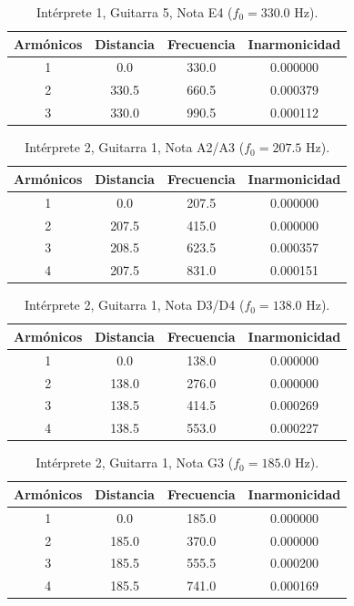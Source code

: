 \begin{table}[htbp]
  \centering
 \small
  \caption{Intérprete 1, Guitarra 5, Nota E4 ($f_0 = 330.0$ Hz).}
  \label{tab:interprete1_g5_e4}
  \begin{tabular}{cccc}
  \toprule
  Armónicos & Distancia & Frecuencia & Inarmonicidad \\
  \midrule
  1 & 0.0 & 330.0 & 0.000000 \\
  2 & 330.5 & 660.5 & 0.000379 \\
  3 & 330.0 & 990.5 & 0.000112 \\
  \bottomrule
  \end{tabular}
\end{table}

\begin{table}[htbp]
  \centering
 \small
  \caption{Intérprete 2, Guitarra 1, Nota A2/A3 ($f_0 = 207.5$ Hz).}
  \label{tab:interprete2_g1_a2_a3}
  \begin{tabular}{cccc}
  \toprule
  Armónicos & Distancia & Frecuencia & Inarmonicidad \\
  \midrule
  1 & 0.0 & 207.5 & 0.000000 \\
  2 & 207.5 & 415.0 & 0.000000 \\
  3 & 208.5 & 623.5 & 0.000357 \\
  4 & 207.5 & 831.0 & 0.000151 \\
  \bottomrule
  \end{tabular}
\end{table}

\begin{table}[htbp]
  \centering
 \small
  \caption{Intérprete 2, Guitarra 1, Nota D3/D4 ($f_0 = 138.0$ Hz).}
  \label{tab:interprete2_g1_d3_d4}
  \begin{tabular}{cccc}
  \toprule
  Armónicos & Distancia & Frecuencia & Inarmonicidad \\
  \midrule
  1 & 0.0 & 138.0 & 0.000000 \\
  2 & 138.0 & 276.0 & 0.000000 \\
  3 & 138.5 & 414.5 & 0.000269 \\
  4 & 138.5 & 553.0 & 0.000227 \\
  \bottomrule
  \end{tabular}
\end{table}

\begin{table}[htbp]
  \centering
 \small
  \caption{Intérprete 2, Guitarra 1, Nota G3 ($f_0 = 185.0$ Hz).}
  \label{tab:interprete2_g1_g3}
  \begin{tabular}{cccc}
  \toprule
  Armónicos & Distancia & Frecuencia & Inarmonicidad \\
  \midrule
  1 & 0.0 & 185.0 & 0.000000 \\
  2 & 185.0 & 370.0 & 0.000000 \\
  3 & 185.5 & 555.5 & 0.000200 \\
  4 & 185.5 & 741.0 & 0.000169 \\
  \bottomrule
  \end{tabular}
\end{table}

